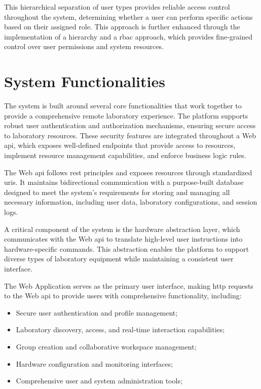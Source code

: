 This hierarchical separation of user types provides reliable access control throughout the system, determining whether a user can perform specific actions based on their assigned role. This approach is further enhanced through the implementation of a hierarchy and a \ac{rbac} approach, which provides fine-grained control over user permissions and system resources.

\section{System Functionalities}\label{sec:system_functionalities}
The system is built around several core functionalities that work together to provide a comprehensive remote laboratory experience. The platform supports robust user authentication and authorization mechanisms, ensuring secure access to laboratory resources. These security features are integrated throughout a Web \acs{api}, which exposes well-defined endpoints that provide access to resources, implement resource management capabilities, and enforce business logic rules.

The Web \acs{api} follows \ac{rest} principles and exposes resources through standardized \acp{uri}. It maintains bidirectional communication with a purpose-built database designed to meet the system's requirements for storing and managing all necessary information, including user data, laboratory configurations, and session logs.

A critical component of the system is the hardware abstraction layer, which communicates with the Web \ac{api} to translate high-level user instructions into hardware-specific commands. This abstraction enables the platform to support diverse types of laboratory equipment while maintaining a consistent user interface.

The Web Application serves as the primary user interface, making \ac{http} requests to the Web \ac{api} to provide users with comprehensive functionality, including:

\begin{itemize}
    \item Secure user authentication and profile management;
    \item Laboratory discovery, access, and real-time interaction capabilities;
    \item Group creation and collaborative workspace management;
    \item Hardware configuration and monitoring interfaces;
    \item Comprehensive user and system administration tools;
\end{itemize}

